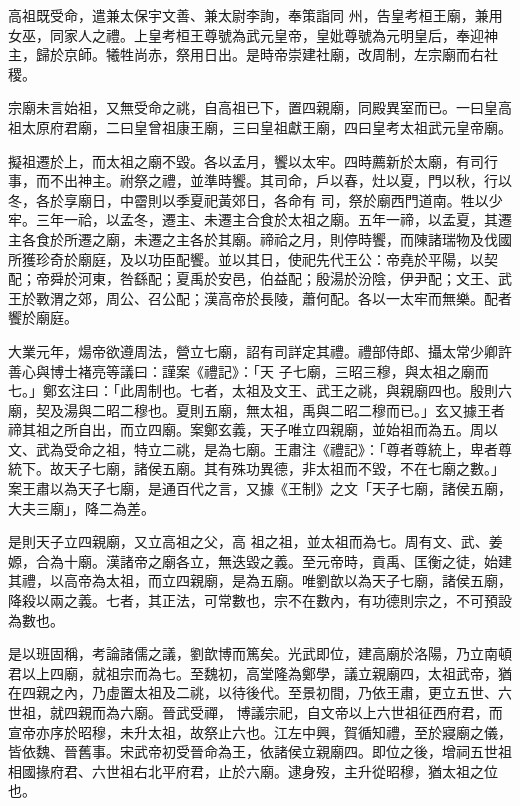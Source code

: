 \begin{pinyinscope}
 高祖既受命，遣兼太保宇文善、兼太尉李詢，奉策詣同
 州，告皇考桓王廟，兼用女巫，同家人之禮。上皇考桓王尊號為武元皇帝，皇妣尊號為元明皇后，奉迎神主，歸於京師。犧牲尚赤，祭用日出。是時帝崇建社廟，改周制，左宗廟而右社稷。



 宗廟未言始祖，又無受命之祧，自高祖已下，置四親廟，同殿異室而已。一曰皇高祖太原府君廟，二曰皇曾祖康王廟，三曰皇祖獻王廟，四曰皇考太祖武元皇帝廟。



 擬祖遷於上，而太祖之廟不毀。各以孟月，饗以太牢。四時薦新於太廟，有司行事，而不出神主。祔祭之禮，並準時饗。其司命，戶以春，灶以夏，門以秋，行以冬，各於享廟日，中霤則以季夏祀黃郊日，各命有
 司，祭於廟西門道南。牲以少牢。三年一祫，以孟冬，遷主、未遷主合食於太祖之廟。五年一禘，以孟夏，其遷主各食於所遷之廟，未遷之主各於其廟。禘祫之月，則停時饗，而陳諸瑞物及伐國所獲珍奇於廟庭，及以功臣配饗。並以其日，使祀先代王公：帝堯於平陽，以契配；帝舜於河東，咎繇配；夏禹於安邑，伯益配；殷湯於汾陰，伊尹配；文王、武王於斁渭之郊，周公、召公配；漢高帝於長陵，蕭何配。各以一太牢而無樂。配者饗於廟庭。



 大業元年，煬帝欲遵周法，營立七廟，詔有司詳定其禮。禮部侍郎、攝太常少卿許善心與博士褚亮等議曰：謹案《禮記》：「天
 子七廟，三昭三穆，與太祖之廟而七。」鄭玄注曰：「此周制也。七者，太祖及文王、武王之祧，與親廟四也。殷則六廟，契及湯與二昭二穆也。夏則五廟，無太祖，禹與二昭二穆而已。」玄又據王者禘其祖之所自出，而立四廟。案鄭玄義，天子唯立四親廟，並始祖而為五。周以文、武為受命之祖，特立二祧，是為七廟。王肅注《禮記》：「尊者尊統上，卑者尊統下。故天子七廟，諸侯五廟。其有殊功異德，非太祖而不毀，不在七廟之數。」案王肅以為天子七廟，是通百代之言，又據《王制》之文「天子七廟，諸侯五廟，大夫三廟」，降二為差。



 是則天子立四親廟，又立高祖之父，高
 祖之祖，並太祖而為七。周有文、武、姜嫄，合為十廟。漢諸帝之廟各立，無迭毀之義。至元帝時，貢禹、匡衡之徒，始建其禮，以高帝為太祖，而立四親廟，是為五廟。唯劉歆以為天子七廟，諸侯五廟，降殺以兩之義。七者，其正法，可常數也，宗不在數內，有功德則宗之，不可預設為數也。



 是以班固稱，考論諸儒之議，劉歆博而篤矣。光武即位，建高廟於洛陽，乃立南頓君以上四廟，就祖宗而為七。至魏初，高堂隆為鄭學，議立親廟四，太祖武帝，猶在四親之內，乃虛置太祖及二祧，以待後代。至景初間，乃依王肅，更立五世、六世祖，就四親而為六廟。晉武受禪，
 博議宗祀，自文帝以上六世祖征西府君，而宣帝亦序於昭穆，未升太祖，故祭止六也。江左中興，賀循知禮，至於寢廟之儀，皆依魏、晉舊事。宋武帝初受晉命為王，依諸侯立親廟四。即位之後，增祠五世祖相國掾府君、六世祖右北平府君，止於六廟。逮身歿，主升從昭穆，猶太祖之位也。




\end{pinyinscope}
